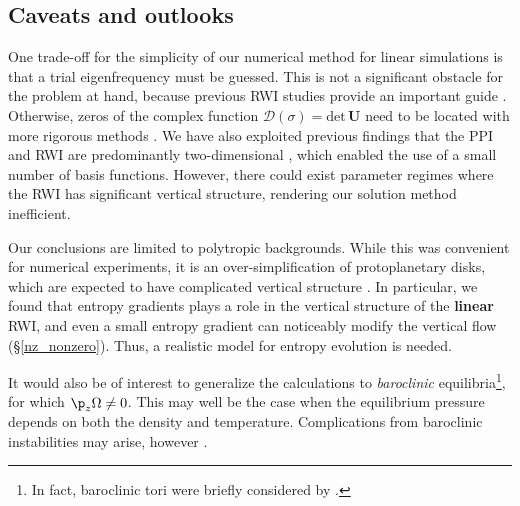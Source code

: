 \subsection{Caveats and outlooks}
One trade-off for the simplicity of our numerical method for 
linear simulations is that a trial eigenfrequency must be
guessed. This is not a significant obstacle for the problem at
hand, because previous RWI studies provide an important guide
\citep[][]{li00}. Otherwise, zeros of the complex function
$\mathcal{D}(\sigma)=\mathrm{det}\,\bm{U}$ need to be located with more 
rigorous methods \citep[e.g.][]{kojima86,valborro07}. We have also exploited
previous findings that the PPI and RWI are predominantly two-dimensional 
\citep{papaloizou85, goldreich86, kojima89, umurhan10, meheut12, lin12, lin12c}, which
enabled the use of a small number of basis functions. 
However, there could exist parameter regimes where the RWI
has significant vertical structure, rendering our solution method
inefficient. 

Our conclusions are limited to polytropic backgrounds. While this was 
convenient for numerical experiments, it is an over-simplification
of protoplanetary disks, which are 
expected to have complicated vertical structure \citep{terquem08}. In
particular, we found that entropy gradients plays a role in the
vertical structure of the {\bf linear} RWI, and even a small entropy gradient can noticeably
modify the vertical flow (\S\ref{nz_nonzero}).
Thus, a realistic model for entropy evolution is needed. 

It would also be of interest to generalize the calculations
to \emph{baroclinic} equilibria\footnote{In fact, baroclinic tori were
  briefly considered by \cite{frank88}.}, 
for which $\p_z\Omega\neq0$. This may well be the 
case when the equilibrium pressure depends on both the density and temperature. 
Complications from baroclinic instabilities may arise, however \citep{knobloch86, umurhan12, nelson12}.

